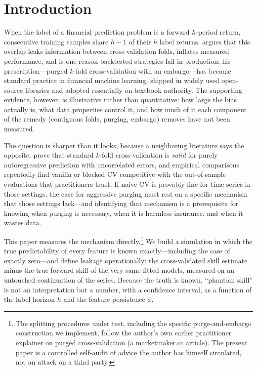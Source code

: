 \documentclass[11pt]{article}
\begin{document}
\section{Introduction}

When the label of a financial prediction problem is a forward $h$-period
return, consecutive training samples share $h-1$ of their $h$ label returns.
\citet{lopezdeprado2018advances} argues that this overlap leaks information
between cross-validation folds, inflates measured performance, and is one
reason backtested strategies fail in production; his prescription---purged
$k$-fold cross-validation with an embargo---has become standard practice in
financial machine learning, shipped in widely used open-source libraries and
adopted essentially on textbook authority. The supporting evidence, however,
is illustrative rather than quantitative: how large the bias actually is, what
data properties control it, and how much of it each component of the remedy
(contiguous folds, purging, embargo) removes have not been measured.

The question is sharper than it looks, because a neighboring literature says
the opposite. \citet{bergmeir2018note} prove that standard $k$-fold
cross-validation is \emph{valid} for purely autoregressive prediction with
uncorrelated errors, and empirical comparisons
\citep{bergmeir2012use,cerqueira2020evaluating} repeatedly find vanilla or
blocked CV competitive with the out-of-sample evaluations
\citep{tashman2000out} that practitioners trust. If naive CV is provably fine
for time series in those settings, the case for aggressive purging must rest
on a specific mechanism that those settings lack---and identifying that
mechanism is a prerequisite for knowing when purging is necessary, when it is
harmless insurance, and when it wastes data.

This paper measures the mechanism directly.\footnote{The splitting procedures
under test, including the specific purge-and-embargo construction we
implement, follow the author's own earlier practitioner explainer on purged
cross-validation (a \mbox{marketmaker.cc} article). The present paper is a
controlled self-audit of advice the author has himself circulated, not an
attack on a third party.} We build a simulation in which the true
predictability of every feature is known exactly---including the case of
exactly zero---and define leakage operationally: the cross-validated skill
estimate minus the true forward skill of the very same fitted models,
measured on an untouched continuation of the series. Because the truth is
known, ``phantom skill'' is not an interpretation but a number, with a
confidence interval, as a function of the label horizon $h$ and the feature
persistence $\phi$.
\end{document}
